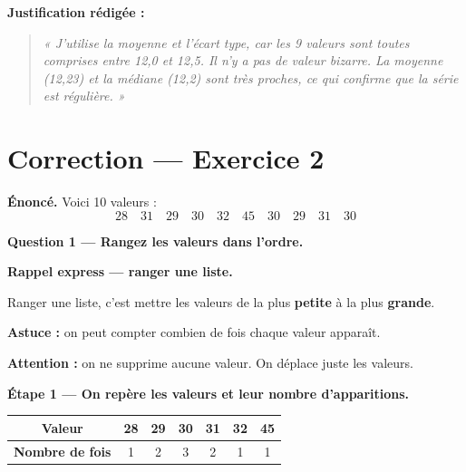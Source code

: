 \documentclass[12pt,a4paper]{article}
\begin{document}
\vspace{0.3cm}
\textbf{Justification rédigée :}
\begin{quote}
\textit{« J'utilise la moyenne et l'écart type, car les 9 valeurs sont toutes comprises entre 12,0 et 12,5. Il n'y a pas de valeur bizarre. La moyenne (12,23) et la médiane (12,2) sont très proches, ce qui confirme que la série est régulière. »}
\end{quote}

\newpage

\section*{Correction — Exercice 2}

\textbf{Énoncé.} Voici 10 valeurs :
\[
28 \quad 31 \quad 29 \quad 30 \quad 32 \quad 45 \quad 30 \quad 29 \quad 31 \quad 30
\]

\vspace{0.3cm}

\begin{correctionbox}
\textbf{Question 1 — Rangez les valeurs dans l'ordre.}
\end{correctionbox}

\begin{rappelcible}
\textbf{Rappel express — ranger une liste.}

\vspace{0.2cm}
Ranger une liste, c'est mettre les valeurs de la plus \textbf{petite} à la plus \textbf{grande}.

\vspace{0.2cm}
\textbf{Astuce :} on peut compter combien de fois chaque valeur apparaît.

\vspace{0.2cm}
\textbf{Attention :} on ne supprime aucune valeur. On déplace juste les valeurs.
\end{rappelcible}

\vspace{0.3cm}
\textbf{Étape 1 — On repère les valeurs et leur nombre d'apparitions.}

\begin{center}
\begin{tabular}{|c|c|c|c|c|c|c|}
\hline
\textbf{Valeur} & 28 & 29 & 30 & 31 & 32 & 45 \\
\hline
\textbf{Nombre de fois} & 1 & 2 & 3 & 2 & 1 & 1 \\
\hline
\end{tabular}
\end{center}
\end{document}
